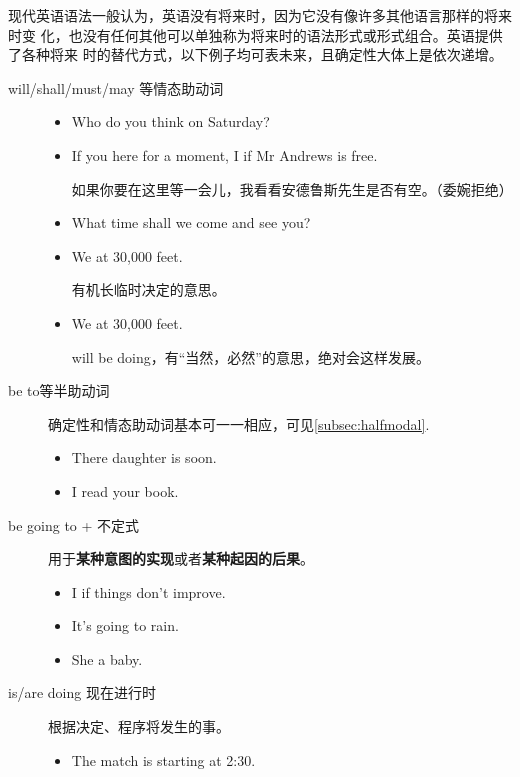 现代英语语法一般认为，英语没有将来时，因为它没有像许多其他语言那样的将来时变
化，也没有任何其他可以单独称为将来时的语法形式或形式组合。英语提供了各种将来
时的替代方式，以下例子均可表未来，且确定性大体上是依次递增。
\begin{description}
\item[will/shall/must/may 等情态助动词]
  \begin{itemize}
  \item Who do you think  on Saturday?

  \item If you here for a moment, I if Mr
    Andrews is free.

    如果你要在这里等一会儿，我看看安德鲁斯先生是否有空。（委婉拒绝）
  \item What time shall we come and see you?

  \item We at 30,000 feet.

    有机长临时决定的意思。

  \item We at 30,000 feet.

    will be doing，有“当然，必然”的意思，绝对会这样发展。
  \end{itemize}
\item[be to等半助动词] 确定性和情态助动词基本可一一相应，可见\cref{subsec:halfmodal}.
  \begin{itemize}
  \item There daughter is  soon.

  \item I read your book.
  \end{itemize}

\item[be going to + 不定式] 用于\textbf{某种意图的实现}或者\textbf{某种起因的后果}。
  \begin{itemize}
  \item I  if things don't improve.
  \item It's going to rain.

  \item She a baby.
  \end{itemize}

\item[is/are doing 现在进行时] 根据决定、程序将发生的事。
  \begin{itemize}
  \item The match is starting at 2:30.


\end{itemize}
\end{description}
